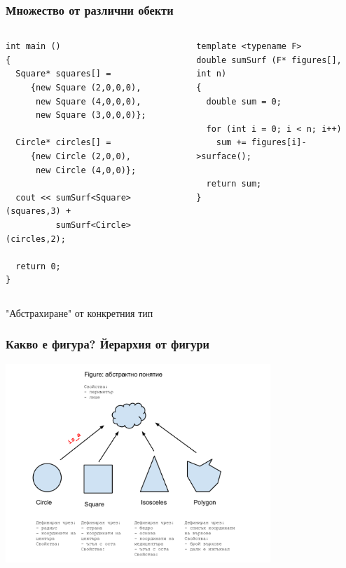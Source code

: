 \documentclass{beamer}
\begin{document}
\begin{frame}[fragile]
\frametitle{Множество от различни обекти}


\begin{columns}[t]
  \begin{column}{0.5\textwidth}
\begin{flushleft}
\begin{lstlisting}
int main ()
{
  Square* squares[] =  
     {new Square (2,0,0,0), 
      new Square (4,0,0,0),
      new Square (3,0,0,0)};

  Circle* circles[] =  
     {new Circle (2,0,0), 
      new Circle (4,0,0)};

  cout << sumSurf<Square> (squares,3) +
          sumSurf<Circle> (circles,2);

  return 0;
}
\end{lstlisting}  
\end{flushleft}
  \end{column}
  \begin{column}{0.5\textwidth}


\begin{flushleft}
\begin{lstlisting}
template <typename F>
double sumSurf (F* figures[], int n)
{
  double sum = 0;
  
  for (int i = 0; i < n; i++)
    sum += figures[i]->surface();

  return sum;
}
\end{lstlisting}  
\end{flushleft}

  \end{column}
\end{columns}


\end{frame}


\begin{frame}
\centerline{"Абстрахиране" от конкретния тип}
\end{frame}



\begin{frame}[fragile]
\frametitle{Какво е фигура? Йерархия от фигури}

\begin{center}
\includegraphics[width=10.0cm]{images/figures_figure} 
\end{center}

\end{frame}
\end{document}
